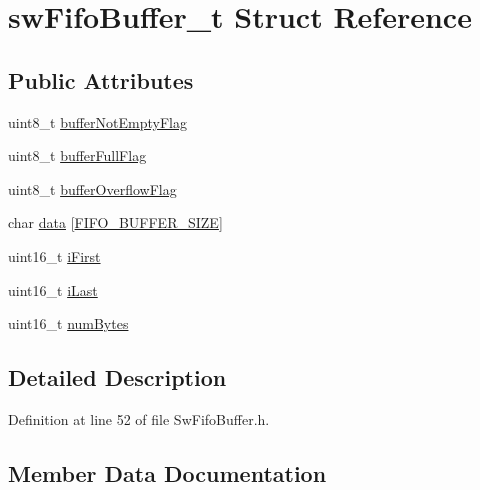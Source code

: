 \hypertarget{structsw_fifo_buffer__t}{}\section{sw\+Fifo\+Buffer\+\_\+t Struct Reference}
\label{structsw_fifo_buffer__t}
\subsection*{Public Attributes}
\begin{DoxyCompactItemize}
\item 
uint8\+\_\+t \hyperlink{structsw_fifo_buffer__t_a5c7c40846fb9a0ce25dba8e99824ad8a}{buffer\+Not\+Empty\+Flag}
\item 
uint8\+\_\+t \hyperlink{structsw_fifo_buffer__t_a8c291f4e2fda846402115081e5a750e7}{buffer\+Full\+Flag}
\item 
uint8\+\_\+t \hyperlink{structsw_fifo_buffer__t_a9bbab1b668fb5a7f96f07478634a50f6}{buffer\+Overflow\+Flag}
\item 
char \hyperlink{structsw_fifo_buffer__t_a0b595a1d13af47083fedafee8e29e26e}{data} \mbox{[}\hyperlink{_sw_fifo_buffer_8h_ad73fd7fab7940b2765b6a7054fc591dd}{F\+I\+F\+O\+\_\+\+B\+U\+F\+F\+E\+R\+\_\+\+S\+I\+Z\+E}\mbox{]}
\item 
uint16\+\_\+t \hyperlink{structsw_fifo_buffer__t_a407513a78db2ae65a38a95646668164e}{i\+First}
\item 
uint16\+\_\+t \hyperlink{structsw_fifo_buffer__t_a37b7c86bf28a0d6c402cd80d41a7abd1}{i\+Last}
\item 
uint16\+\_\+t \hyperlink{structsw_fifo_buffer__t_a05db6308e5fee7d2591c4bc4e21505da}{num\+Bytes}
\end{DoxyCompactItemize}


\subsection{Detailed Description}


Definition at line 52 of file Sw\+Fifo\+Buffer.\+h.



\subsection{Member Data Documentation}
\hypertarget{structsw_fifo_buffer__t_a5c7c40846fb9a0ce25dba8e99824ad8a}{}
